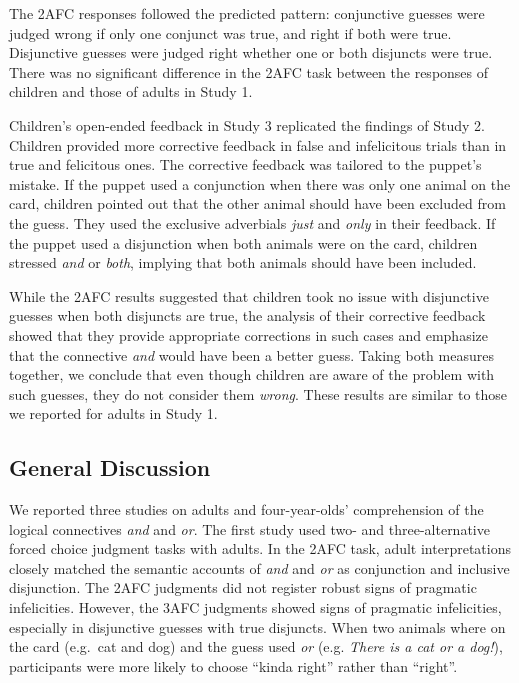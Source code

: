 \documentclass[floatsintext,man]{apa6}
\theoremstyle{definition}
\theoremstyle{definition}
\theoremstyle{definition}
\theoremstyle{remark}
\begin{document}
The 2AFC responses followed the predicted pattern: conjunctive guesses
were judged wrong if only one conjunct was true, and right if both were
true. Disjunctive guesses were judged right whether one or both
disjuncts were true. There was no significant difference in the 2AFC
task between the responses of children and those of adults in Study 1.

Children's open-ended feedback in Study 3 replicated the findings of
Study 2. Children provided more corrective feedback in false and
infelicitous trials than in true and felicitous ones. The corrective
feedback was tailored to the puppet's mistake. If the puppet used a
conjunction when there was only one animal on the card, children pointed
out that the other animal should have been excluded from the guess. They
used the exclusive adverbials \emph{just} and \emph{only} in their
feedback. If the puppet used a disjunction when both animals were on the
card, children stressed \emph{and} or \emph{both}, implying that both
animals should have been included.

While the 2AFC results suggested that children took no issue with
disjunctive guesses when both disjuncts are true, the analysis of their
corrective feedback showed that they provide appropriate corrections in
such cases and emphasize that the connective \emph{and} would have been
a better guess. Taking both measures together, we conclude that even
though children are aware of the problem with such guesses, they do not
consider them \emph{wrong}. These results are similar to those we
reported for adults in Study 1.

\subsection{General Discussion}\label{general-discussion}

We reported three studies on adults and four-year-olds' comprehension of
the logical connectives \emph{and} and \emph{or}. The first study used
two- and three-alternative forced choice judgment tasks with adults. In
the 2AFC task, adult interpretations closely matched the semantic
accounts of \emph{and} and \emph{or} as conjunction and inclusive
disjunction. The 2AFC judgments did not register robust signs of
pragmatic infelicities. However, the 3AFC judgments showed signs of
pragmatic infelicities, especially in disjunctive guesses with true
disjuncts. When two animals where on the card (e.g.~cat and dog) and the
guess used \emph{or} (e.g. \emph{There is a cat or a dog!}),
participants were more likely to choose \enquote{kinda right} rather
than \enquote{right}.
\end{document}
